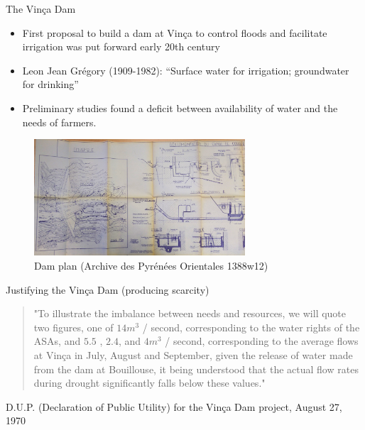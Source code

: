 \documentclass[newPxFont]{beamer}
\begin{document}
\begin{frame}[c]{The Vinça Dam }
\begin{itemize}
	\item First proposal to build a dam at Vinça to control floods and facilitate irrigation was put forward early 20th century
	\item Leon Jean Grégory (1909-1982): “Surface water for irrigation; groundwater for drinking”
	\item Preliminary studies found a deficit between availability of water and the needs of farmers.
\end{itemize}
\begin{figure}
	\centering
	\includegraphics[width = 0.7\textwidth]{img/plan-barrage}
	 \caption{Dam plan (Archive des Pyrénées Orientales 1388w12)}
\end{figure}

\end{frame}



\begin{frame}[c]{Justifying the Vinça Dam (producing scarcity) }

\begin{quote}
	"To illustrate the imbalance between needs and resources, we will quote two figures, one of $14 m^3$ / second,  corresponding to the water rights of the ASAs,  and $5.5$ , $2.4$, and $4 m^3$ / second, corresponding to the average flows at Vinça in July, August and September, given the release of water made from the dam at Bouillouse, it being understood that the actual flow rates during drought significantly falls below these values."
\end{quote}
D.U.P. (Declaration of Public Utility) for the Vinça Dam project, August 27, 1970
\end{frame}

\end{document}
